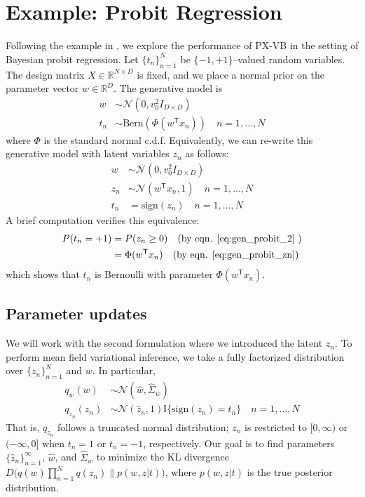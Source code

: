 \documentclass{article}
\begin{document}
\section{Example: Probit Regression}
\label{probit}

Following the example in \cite{Qi}, we explore the performance of PX-VB in the setting of Bayesian probit regression. Let $\{t_n\}_{n=1}^N$ be $\{-1,+1\}$--valued random variables. The design matrix $X\in\mathbb R^{N\times D}$ is fixed, and we place a normal prior on the parameter vector $w\in\mathbb R^D$. The generative model is
\begin{align}
w &\sim \mathcal N (0, v_0^2I_{D\times D}) \\
t_n &\sim \text{Bern}(\Phi(w^\mathsf T x_n))\quad n = 1, ..., N \label{eq:gen_probit_1}
\end{align}
where $\Phi$ is the standard normal c.d.f. Equivalently, we can re-write this generative model with latent variables $z_n$ as follows: 
\begin{align}
    w &\sim \mathcal N (0, v_0^2I_{D\times D}) \\
    z_n &\sim \mathcal N (w^\mathsf T x_n, 1)\quad n = 1, ..., N \label{eq:gen_probit_zn}\\
    t_n &= \text{sign}(z_n) \quad n = 1, ..., N \label{eq:gen_probit_2}
\end{align}
A brief computation verifies this equivalence: 
\begin{align}
P(t_n = +1) &= P(z_n \geq 0) \quad \text{(by eqn. \ref{eq:gen_probit_2} )}\\
&= \Phi(w^\mathsf Tx_n) \quad \text{(by eqn. \ref{eq:gen_probit_zn})}
\end{align}
which shows that $t_n$ is Bernoulli with parameter $\Phi(w^\mathsf Tx_n)$. 

\subsection{Parameter updates}
We will work with the second formulation where we introduced the latent $z_n$. To perform mean field variational inference, we take a fully factorized distribution over $\{z_n\}_{n=1}^N$ and $w$. In particular, 
\begin{align}
    q_w(w) &\sim \mathcal N (\hat w, \hat\Sigma_w)\\
    q_{z_n}(z_n) &\sim \mathcal{N}(\hat z_n, 1)\mathbb I\{\text{sign}(z_n) = t_n\} \quad n = 1, ..., N
\end{align}
That is, $q_{z_n}$ follows a truncated normal distribution; $z_n$ is restricted to $[0,\infty)$ or $(-\infty,  0]$ when $t_n=1$ or $t_n=-1$, respectively. Our goal is to find parameters $\{\hat z_n\}_{n=1}^\infty$, $\hat w$, and $\hat\Sigma_w$ to minimize the KL divergence $D\big(q(w) \prod_{n=1}^N q(z_n)\|p(w, z| t)\big)$, where $p(w,z|t)$ is the true posterior distribution. 
\end{document}
